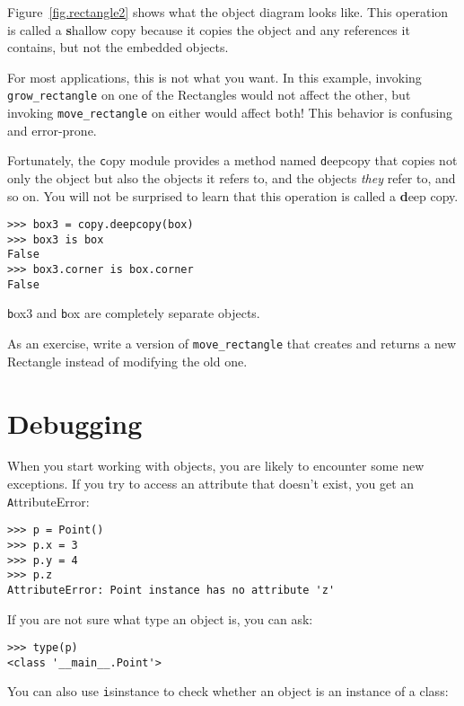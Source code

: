\documentclass[
DIV=11,
fontsize=13,
twoside,
headinclude=false,
titlepage=firstiscover,
abstract=true,
headsepline=true,
footsepline=true,
chapterprefix=true, %
headings=big,
bibliography=totoc,%
captions=tableheading
]{scrbook}
\theoremstyle{definition}
\begin{document}
Figure~\ref{fig.rectangle2} shows what the object diagram looks like.
This operation is called a {\textbf shallow copy} because it copies the
object and any references it contains, but not the embedded objects.

For most applications, this is not what you want.  In this example,
invoking \verb"grow_rectangle" on one of the Rectangles would not
affect the other, but invoking \verb"move_rectangle" on either would
affect both!  This behavior is confusing and error-prone.

Fortunately, the {\texttt copy} module provides a method named {\texttt
deepcopy} that copies not only the object but also 
the objects it refers to, and the objects {\em they} refer to,
and so on.
You will not be surprised to learn that this operation is
called a {\textbf deep copy}.

\begin{lstlisting}
>>> box3 = copy.deepcopy(box)
>>> box3 is box
False
>>> box3.corner is box.corner
False
\end{lstlisting}
%
{\texttt box3} and {\texttt box} are completely separate objects.

As an exercise, write a version of \verb"move_rectangle" that creates and
returns a new Rectangle instead of modifying the old one.


\section{Debugging}
\label{hasattr}

When you start working with objects, you are likely to encounter
some new exceptions.  If you try to access an attribute
that doesn't exist, you get an {\texttt AttributeError}:

\begin{lstlisting}
>>> p = Point()
>>> p.x = 3
>>> p.y = 4
>>> p.z
AttributeError: Point instance has no attribute 'z'
\end{lstlisting}
%
If you are not sure what type an object is, you can ask:

\begin{lstlisting}
>>> type(p)
<class '__main__.Point'>
\end{lstlisting}
%
You can also use {\texttt isinstance} to check whether an object
is an instance of a class:
\end{document}

